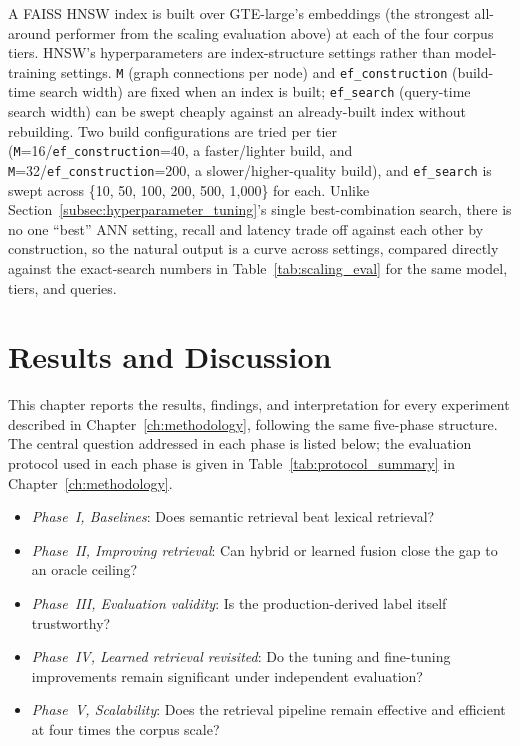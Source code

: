 \documentclass[a4paper,oneside,bibliography=totoc]{scrbook}
\begin{document}
A FAISS \citep{johnson2017billion} HNSW index is built over GTE-large's embeddings (the strongest all-around performer from the scaling evaluation above) at each of the four corpus tiers. HNSW's hyperparameters are index-structure settings rather than model-training settings. \texttt{M} (graph connections per node) and \texttt{ef\_construction} (build-time search width) are fixed when an index is built; \texttt{ef\_search} (query-time search width) can be swept cheaply against an already-built index without rebuilding. Two build configurations are tried per tier (\texttt{M}=16/\texttt{ef\_construction}=40, a faster/lighter build, and \texttt{M}=32/\texttt{ef\_construction}=200, a slower/higher-quality build), and \texttt{ef\_search} is swept across \{10, 50, 100, 200, 500, 1{,}000\} for each. Unlike Section~\ref{subsec:hyperparameter_tuning}'s single best-combination search, there is no one ``best'' ANN setting, recall and latency trade off against each other by construction, so the natural output is a curve across settings, compared directly against the exact-search numbers in Table~\ref{tab:scaling_eval} for the same model, tiers, and queries.


\chapter{Results and Discussion}
\label{ch:results}

This chapter reports the results, findings, and interpretation for every experiment described in Chapter~\ref{ch:methodology}, following the same five-phase structure. The central question addressed in each phase is listed below; the evaluation protocol used in each phase is given in Table~\ref{tab:protocol_summary} in Chapter~\ref{ch:methodology}.
\begin{itemize}
\setlength\itemsep{0pt}
\setlength\parskip{0pt}
\item \emph{Phase~I, Baselines}: Does semantic retrieval beat lexical retrieval?
\item \emph{Phase~II, Improving retrieval}: Can hybrid or learned fusion close the gap to an oracle ceiling?
\item \emph{Phase~III, Evaluation validity}: Is the production-derived label itself trustworthy?
\item \emph{Phase~IV, Learned retrieval revisited}: Do the tuning and fine-tuning improvements remain significant under independent evaluation?
\item \emph{Phase~V, Scalability}: Does the retrieval pipeline remain effective and efficient at four times the corpus scale?
\end{itemize}
\end{document}
